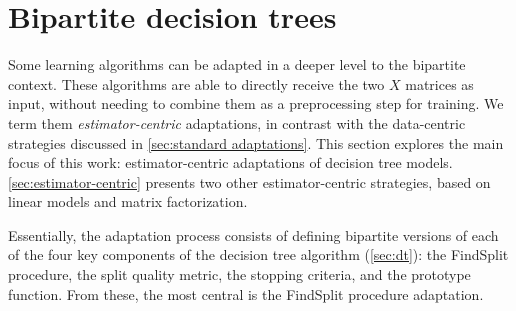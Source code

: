 

\section{Bipartite decision trees}
\label{sec:bipartite_trees}

Some learning algorithms can be adapted in a deeper level to the bipartite context. These algorithms are able to directly receive the two $X$ matrices as input, without needing to combine them as a preprocessing step for training.  %
We term them \emph{estimator-centric} adaptations, in contrast with the data-centric strategies discussed in \autoref{sec:standard adaptations}.  %
%
%
This section explores the main focus of this work: estimator-centric adaptations of decision tree models. \autoref{sec:estimator-centric} presents two other estimator-centric strategies, based on linear models and matrix factorization.


Essentially, the adaptation process consists of defining bipartite versions of each of the four key components of the decision tree algorithm (\autoref{sec:dt}): the FindSplit procedure, the split quality metric, the stopping criteria, and the prototype function. From these, the most central is the FindSplit procedure adaptation.
 
